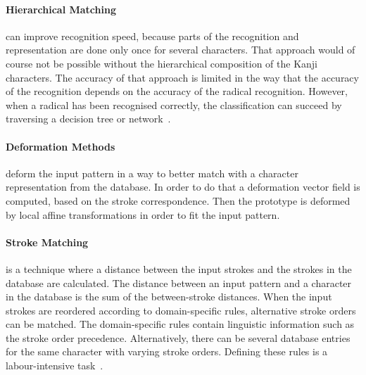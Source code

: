 \paragraph{Hierarchical Matching} can improve recognition speed, because parts 
of the recognition and representation are done only once for several characters.
That approach would of course not be possible without the hierarchical 
composition of the Kanji characters. The accuracy of that approach is limited in
the way that the accuracy of the recognition depends on the accuracy of the
radical recognition. However, when a radical has been recognised correctly, 
the classification can succeed by traversing a decision tree or 
network~.

\paragraph{Deformation Methods} deform the input pattern in a way to better match
with a character representation from the database. In order to do that a 
deformation vector field is computed, based on the stroke correspondence.
Then the prototype is deformed by local affine transformations in order to fit 
the input pattern.

\paragraph{Stroke Matching} is a technique where a distance between the input 
strokes and the strokes in the database are calculated. The distance between an
input pattern and a character in the database is the sum of the between-stroke
distances. When the input strokes are reordered according to domain-specific 
rules, alternative stroke orders can be matched. The domain-specific rules 
contain linguistic information such as the stroke order precedence.
Alternatively, there can be several database entries for the same character with
varying stroke orders. Defining these rules is a labour-intensive 
task~.

